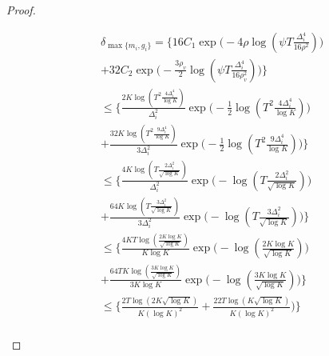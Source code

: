 \begin{proof}
\begin{small}
\begin{align*}
& \delta_{\max\lbrace m_{i}, g_{i}\rbrace}= \bigg\lbrace 16 C_1\exp\bigg(-4\rho\log (\psi T\frac{\Delta_{i}^{4}}{16\rho^{2}})\bigg)\\
& + 32C_2\exp\bigg(- \frac{3\rho_v}{2} \log(\psi T\frac{\Delta_{i}^{4}}{16\rho_{v}^{2}}) \bigg) \bigg\rbrace\\
&\leq \bigg\lbrace  \frac{2K\log ( T^2 \frac{4\Delta_{i}^{4}}{\log K})}{\Delta_{i}^{2}}\exp\bigg(-\frac{1}{2}\log ( T^2\frac{4\Delta_{i}^{4}}{\log K})\bigg)\\
& + \frac{32K\log ( T^2 \frac{9\Delta_{i}^{4}}{\log K})}{3\Delta_{i}^{2}}\exp\bigg(- \frac{1}{2} \log( T^2 \frac{9\Delta_{i}^{4}}{\log K}) \bigg) \bigg\rbrace\\
&\leq \bigg\lbrace  \frac{4K\log ( T \frac{2\Delta_{i}^{2}}{\sqrt{\log K}})}{\Delta_{i}^{2}}\exp\bigg(-\log ( T\frac{2\Delta_{i}^{2}}{\sqrt{\log K}})\bigg)\\
& + \frac{64K\log ( T \frac{3\Delta_{i}^{2}}{\sqrt{\log K}})}{3\Delta_{i}^{2}}\exp\bigg(- \log( T \frac{3\Delta_{i}^{2}}{\sqrt{\log K}}) \bigg) \bigg\rbrace\\
&\leq \bigg\lbrace  \frac{4KT\log ( \frac{2 K\log K}{\sqrt{\log K}})}{K\log K}\exp\bigg(-\log ( \frac{2K\log K}{\sqrt{\log K}})\bigg)\\
& + \frac{64TK\log (\frac{3 K\log K}{\sqrt{\log K}})}{3 K\log K}\exp\bigg(- \log( \frac{3 K\log K}{\sqrt{\log K}}) \bigg) \bigg\rbrace\\
&\leq \bigg\lbrace  \frac{2T\log (2 K\sqrt{\log K})}{K (\log K)^2}
 + \frac{22T\log ( K\sqrt{\log K})}{ K(\log K)^2}\bigg) \bigg\rbrace\\
\end{align*}
\end{small}


\end{proof}
